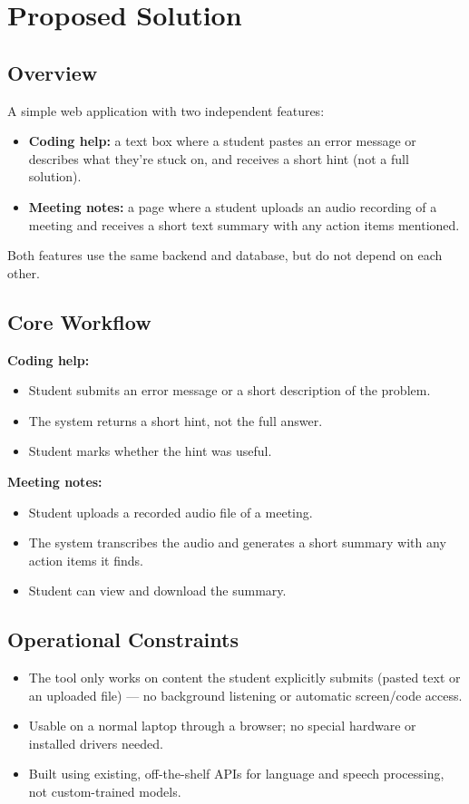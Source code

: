 \documentclass[11pt]{article}
\begin{document}
\section{Proposed Solution}

\subsection{Overview}
A simple web application with two independent features:
\begin{itemize}
    \item \textbf{Coding help:} a text box where a student pastes an error message or describes what they're stuck on, and receives a short hint (not a full solution).
    \item \textbf{Meeting notes:} a page where a student uploads an audio recording of a meeting and receives a short text summary with any action items mentioned.
\end{itemize}
Both features use the same backend and database, but do not depend on each other.

\subsection{Core Workflow}
\textbf{Coding help:}
\begin{itemize}
    \item Student submits an error message or a short description of the problem.
    \item The system returns a short hint, not the full answer.
    \item Student marks whether the hint was useful.
\end{itemize}

\textbf{Meeting notes:}
\begin{itemize}
    \item Student uploads a recorded audio file of a meeting.
    \item The system transcribes the audio and generates a short summary with any action items it finds.
    \item Student can view and download the summary.
\end{itemize}

\subsection{Operational Constraints}
\begin{itemize}
    \item The tool only works on content the student explicitly submits (pasted text or an uploaded file) --- no background listening or automatic screen/code access.
    \item Usable on a normal laptop through a browser; no special hardware or installed drivers needed.
    \item Built using existing, off-the-shelf APIs for language and speech processing, not custom-trained models.
\end{itemize}
\end{document}
